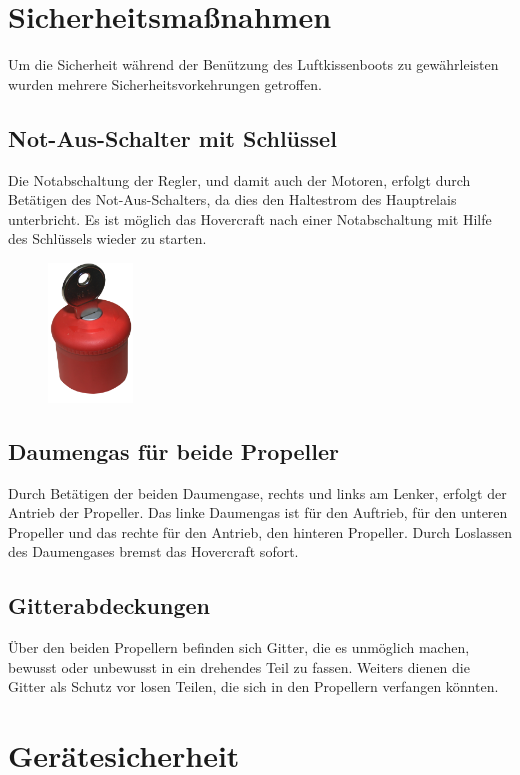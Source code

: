 
\section{Sicherheitsmaßnahmen}
Um die Sicherheit während der Benützung des Luftkissenboots zu gewährleisten wurden mehrere Sicherheitsvorkehrungen getroffen.
\subsection{Not-Aus-Schalter mit Schlüssel}
Die Notabschaltung der Regler, und damit auch der Motoren, erfolgt durch Betätigen des Not-Aus-Schalters, da dies den Haltestrom des Hauptrelais unterbricht. 
Es ist möglich das Hovercraft nach einer Notabschaltung mit Hilfe des Schlüssels wieder zu starten. 

\begin{figure}[h]
    \centering
    \includegraphics[width=0.2\textwidth]{Fotos/Notaus.png}
\end{figure}
  

\subsection{Daumengas für beide Propeller}
Durch Betätigen der beiden Daumengase, rechts und links am Lenker, erfolgt der Antrieb der Propeller. Das linke Daumengas ist für den Auftrieb, für den unteren Propeller und
das rechte für den Antrieb, den hinteren Propeller. Durch Loslassen des Daumengases bremst das Hovercraft sofort.

\subsection{Gitterabdeckungen}
Über den beiden Propellern befinden sich Gitter, die es unmöglich machen, bewusst oder unbewusst in ein drehendes Teil zu fassen. 
Weiters dienen die Gitter als Schutz vor losen Teilen, die sich in den Propellern verfangen könnten. 

\section{Gerätesicherheit}

